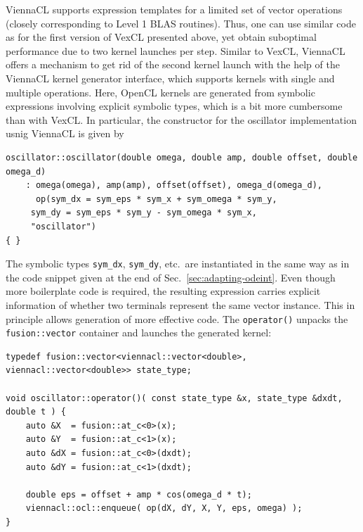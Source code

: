 \documentclass[final]{siamltex}
\newcommand{\code}[1]{\lstinline|#1|}
\begin{document}
ViennaCL supports expression templates for a limited set of    %
vector operations (closely corresponding to Level 1 BLAS routines).
Thus, one can use similar code as for the first version of VexCL presented above,
yet obtain suboptimal performance due to two kernel launches per step.
Similar to VexCL, ViennaCL offers a mechanism to get rid of the second kernel launch
with the help of the ViennaCL kernel generator interface, which supports kernels with single and multiple operations.
Here, OpenCL kernels are generated from symbolic expressions involving explicit symbolic types,
which is a bit more cumbersome than with VexCL. In particular, the constructor
for the oscillator implementation usnig ViennaCL is given by
%
%
%
\begin{lstlisting}
oscillator::oscillator(double omega, double amp, double offset, double omega_d)
    : omega(omega), amp(amp), offset(offset), omega_d(omega_d),
      op(sym_dx = sym_eps * sym_x + sym_omega * sym_y,
	 sym_dy = sym_eps * sym_y - sym_omega * sym_x,
	 "oscillator")
{ }
\end{lstlisting}
%
The symbolic types \code{sym_dx}, \code{sym_dy}, etc.~are instantiated in the same way
as in the code snippet given at the end of Sec.~\ref{sec:adapting-odeint}.
Even though more boilerplate code is required, the resulting expression
carries explicit information of whether two terminals represent the same vector
instance. This in principle allows generation of more effective code. The
\code{operator()} unpacks the \code{fusion::vector} container and launches
the generated kernel:
\begin{lstlisting}
typedef fusion::vector<viennacl::vector<double>, viennacl::vector<double>> state_type;

void oscillator::operator()( const state_type &x, state_type &dxdt, double t ) {
    auto &X  = fusion::at_c<0>(x);
    auto &Y  = fusion::at_c<1>(x);
    auto &dX = fusion::at_c<0>(dxdt);
    auto &dY = fusion::at_c<1>(dxdt);

    double eps = offset + amp * cos(omega_d * t);
    viennacl::ocl::enqueue( op(dX, dY, X, Y, eps, omega) );
}
\end{lstlisting}
\end{document}
